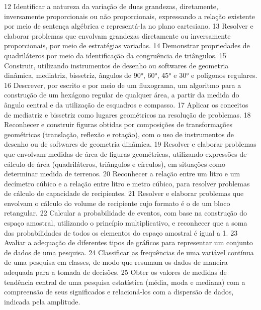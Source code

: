 {{{			}
			{12}{%
				Identificar a natureza da variação de duas grandezas, diretamente, inversamente
				proporcionais ou não proporcionais, expressando a relação existente por meio de sentença
				algébrica e representá-la no plano cartesiano.
			}
			{13}{%
				Resolver e elaborar problemas que envolvam grandezas diretamente ou
				inversamente proporcionais, por meio de estratégias variadas.
			}
			{14}{%
				Demonstrar propriedades de quadriláteros por meio da identificação da
				congruência de triângulos.
			}
			{15}{%
				Construir, utilizando instrumentos de desenho ou softwares de geometria
				dinâmica, mediatriz, bissetriz, ângulos de 90°, 60°, 45° e 30° e polígonos regulares.
			}
			{16}{%
				Descrever, por escrito e por meio de um fluxograma, um algoritmo para a
				construção de um hexágono regular de qualquer área, a partir da medida do ângulo central e
				da utilização de esquadros e compasso.
			}
			{17}{%
				Aplicar os conceitos de mediatriz e bissetriz como lugares geométricos na
				resolução de problemas.
			}
			{18}{%
				Reconhecer e construir figuras obtidas por composições de transformações
				geométricas (translação, reflexão e rotação), com o uso de instrumentos de desenho ou de
				softwares de geometria dinâmica.
			}
			{19}{%
				Resolver e elaborar problemas que envolvam medidas de área de figuras
				geométricas, utilizando expressões de cálculo de área (quadriláteros, triângulos e círculos), em
				situações como determinar medida de terrenos.
			}
			{20}{%
				Reconhecer a relação entre um litro e um decímetro cúbico e a relação entre litro
				e metro cúbico, para resolver problemas de cálculo de capacidade de recipientes.
			}
			{21}{%
				Resolver e elaborar problemas que envolvam o cálculo do volume de recipiente
				cujo formato é o de um bloco retangular.
			}
			{22}{%
				Calcular a probabilidade de eventos, com base na construção do espaço amostral,
				utilizando o princípio multiplicativo, e reconhecer que a soma das probabilidades de todos os
				elementos do espaço amostral é igual a 1.
			}
			{23}{%
				Avaliar a adequação de diferentes tipos de gráficos para representar um conjunto
				de dados de uma pesquisa.
			}
			{24}{%
				Classificar as frequências de uma variável contínua de uma pesquisa em classes,
				de modo que resumam os dados de maneira adequada para a tomada de decisões.
			}
			{25}{%
				Obter os valores de medidas de tendência central de uma pesquisa estatística
				(média, moda e mediana) com a compreensão de seus significados e relacioná-los com a
				dispersão de dados, indicada pela amplitude.
}}}
